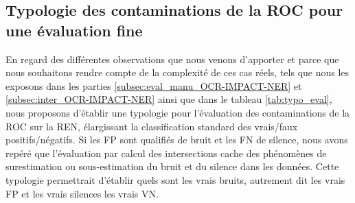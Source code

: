 \subsection{Typologie des contaminations de la ROC pour une évaluation fine}
\label{subsec:Typologie_OCR-IMPACT-NER}
En regard des différentes observations que nous venons d'apporter et parce que nous souhaitons rendre compte de la complexité de ces cas réels, tels que nous les exposons dans les parties \ref{subsec:eval_manu_OCR-IMPACT-NER} et \ref{subsec:inter_OCR-IMPACT-NER} ainsi que dans le tableau \ref{tab:typo_eval}, nous proposons d'établir une typologie pour l'évaluation des contaminations de la ROC sur la REN, élargissant la classification standard des vrais/faux positifs/négatifs. Si les FP sont qualifiés de bruit et les FN de silence, nous avons repéré que l'évaluation par calcul des intersections cache des phénomènes de surestimation ou sous-estimation du bruit et du silence dans les données. Cette typologie permettrait d'établir quels sont les vrais bruits, autrement dit les vrais FP et les vrais silences les vrais VN. 


